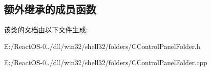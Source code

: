 \subsection*{额外继承的成员函数}


该类的文档由以下文件生成\+:\begin{DoxyCompactItemize}
\item 
E\+:/\+React\+O\+S-\/0../dll/win32/shell32/folders/C\+Control\+Panel\+Folder.\+h\item 
E\+:/\+React\+O\+S-\/0../dll/win32/shell32/folders/C\+Control\+Panel\+Folder.\+cpp\end{DoxyCompactItemize}
